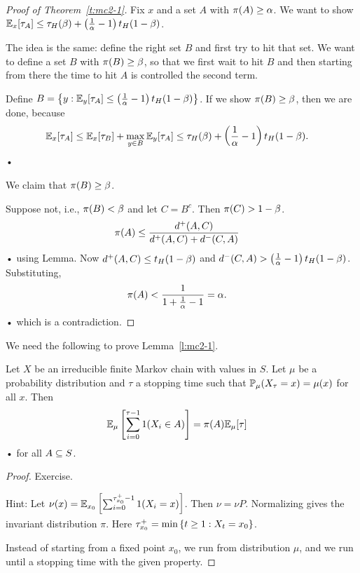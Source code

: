 
\begin{proof}[Proof of Theorem~\ref{t:mc2-1}]
Fix $x$ and a set $A$ with $\pi(A)\ge \alpha$. We want to show $\mathbb{E}_x[\tau_A]\le \tau_H(\beta) + \left( {\frac{1}{\alpha} -1} \right)t_H(1-\beta)$. 

The idea is the same: define the right set $B$ and first try to hit that set. We want to define a set $B$ with $\pi(B)\ge \beta$, so that we first wait to hit $B$ and then starting from there the time to hit $A$ is controlled the second term.

Define $B=\left\{{y}:{\mathbb{E}_y[\tau_A]\le \left( {\frac{1}{\alpha} - 1} \right)t_H(1-\beta)}\right\}$. If we show $\pi(B)\ge \beta$, then we are done, because
\begin{align*}
\mathbb{E}_x[\tau_A] &\le \mathbb{E}_x [\tau_B] + \max_{y\in B}\mathbb{E}_y[\tau_A] \le \tau_H(\beta) + \left( {\frac{1}{\alpha}-1} \right)t_H(1-\beta).
\end{align*}•

We claim that $\pi(B)\ge \beta$. 

Suppose not, i.e., $\pi(B)<\beta$ and let $C=B^c$. Then $\pi(C)>1-\beta$.
\begin{align*}
\pi(A) &\le \frac{d^+(A,C)}{d^+(A,C)+d^-(C,A)}
\end{align*}•
using Lemma. Now $d^+(A,C) \le t_H(1-\beta)$ and $d^-(C,A)> \left( {\frac{1}{\alpha}-1} \right) t_H(1-\beta)$. Substituting,
\begin{align*}
\pi(A) &< \frac{1}{1+\frac{1}{\alpha} - 1}=\alpha.
\end{align*}•
which is a contradiction.
\end{proof}

We need the following to prove Lemma~\ref{l:mc2-1}.
\begin{lem}
Let $X$ be an irreducible finite Markov chain with values in $S$. Let $\mu$ be a probability distribution and $\tau$ a stopping time such that $\mathbb{P}_\mu(X_\tau=x)=\mu(x)$ for all $x$.
Then 
\begin{align*}
\mathbb{E}_\mu \left[ {\sum_{i=0}^{\tau-1} 1(X_i\in A)} \right] &= \pi(A) \mathbb{E}_\mu[\tau]
\end{align*}•
for all $A\subseteq S$. 
\end{lem}
\begin{proof}
Exercise.

Hint: Let $\nu(x) = \mathbb{E}_{x_0}\left[ {\sum_{i=0}^{\tau_{x_0}^+-1} 1(X_i=x)} \right]$. Then $\nu = \nu P$. Normalizing gives the invariant distribution $\pi$. Here $\tau_{x_0}^+ = \min\left\{{t\ge 1}:{X_t=x_0}\right\}$. 

Instead of starting from a fixed point $x_0$, we run from distribution $\mu$, and we run until a stopping time with the given property. 
\end{proof}

